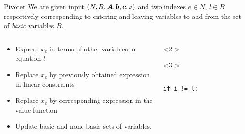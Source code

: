 \documentclass[aspectratio = 169]{beamer}
\begin{document}
\begin{frame}[fragile]{Pivoter}
  We are given input $(N, B, \boldsymbol{A}, \boldsymbol{b}, \boldsymbol{c}, \nu)$ and two
  indexes $e \in N$, $l\in B$ respectively corresponding to
  entering and leaving variables to and from the set of \textit{basic}
  variables $B$.
    \begin{columns}
        \begin{column}{.5\textwidth}
            \begin{itemize}
                \item[\textbullet]<2->
                  Express $x_e$ in terms of other variables in
                  equation $l$
                \item[\textbullet]<3->
                  Replace $x_e$ by previously obtained expression in
                  linear constraints
                \item[\textbullet]<4->
                  Replace $x_e$ by corresponding expression in the
                  value function
                \item[\textbullet]<5->
                  Update basic and none basic sets of variables.
            \end{itemize}
        \end{column}
        \begin{column}{.5\textwidth}
            \begin{overlayarea}{.96\textwidth}{.45\textheight}
            \begin{onlyenv}<2->
                \begin{tcolorbox}[
                    enhanced,
                    parbox = false,
                    colback = mLightBrown!10!white,
                    colframe = mLightBrown,
                    arc = 0mm,
                    ]
                    \small{
                    }
                    \end{tcolorbox}
            \end{onlyenv}
            \begin{onlyenv}<3->
                \begin{tcolorbox}[
                    enhanced,
                    parbox = false,
                    colback = mLightBrown!10!white,
                    colframe = mLightBrown,
                    arc = 0mm,
                    ]
                    \small{
                      \begin{verbatim}
                        if i != l:

\end{verbatim}}
\end{tcolorbox}
\end{onlyenv}
\end{overlayarea}
\end{column}
\end{columns}
\end{frame}
\end{document}
